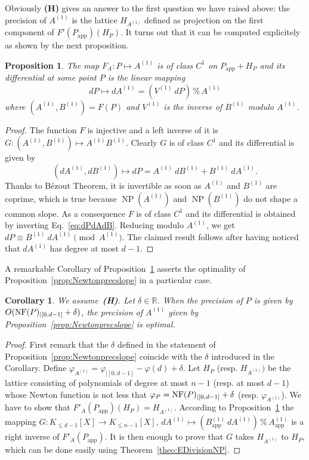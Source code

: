 \documentclass{sig-alternate-05-2015}
\DeclareMathOperator{\NP}{NP}
\newcommand{\R}{\mathbb R}
\newcommand{\NF}{\text{\rm NF}}
\renewcommand{\mod}{\,\%\,}
\newcommand{\app}{\textrm{app}}
\newtheorem{prop}[theo]{Proposition}
\newtheorem{cor}[theo]{Corollary}
\theoremstyle{definition}
\begin{document}
\bigskip

\noindent
Obviously \textbf{(H)} gives an answer to the first question we have 
raised above: the precision of $A^{(1)}$ is the lattice 
$H_{A^{(1)}}$ defined as projection on the first component of 
$F'(P_\app)(H_P)$. It turns out that it can be computed explicitely as 
shown by the next proposition.

\begin{prop}
\label{prop:precA1}
The map $F_A : P \mapsto A^{(1)}$ is of class $C^1$ on $P_\app + H_P$
and its differential at some point $P$ is the linear mapping
$$dP \mapsto dA^{(1)} = (V^{(1)} \: dP) \mod A^{(1)}$$
where $(A^{(1)}, B^{(1)}) = F(P)$ and $V^{(1)}$ is the inverse of 
$B^{(1)}$ modulo $A^{(1)}$.
\end{prop}

\begin{proof}
The function $F$ is injective and a left inverse of it is
$G : (A^{(1)},B^{(1)}) \mapsto A^{(1)}B^{(1)}$.
Clearly $G$ is of class $C^1$ and its differential is given by
\begin{equation}
\label{eq:dPdAdB}
(dA^{(1)}, dB^{(1)}) \mapsto dP = A^{(1)} \: dB^{(1)} + B^{(1)} \: dA^{(1)}.
\end{equation}
Thanks to Bézout Theorem, it is invertible as soon as $A^{(1)}$ and 
$B^{(1)}$ are coprime, which is true because $\NP(A^{(1)})$ and 
$\NP(B^{(1)})$ do not shape a common slope. As a consequence $F$ is of 
class $C^1$ and its differential is obtained by inverting 
Eq.~\eqref{eq:dPdAdB}. Reducing modulo $A^{(1)}$, we get $dP \equiv 
B^{(1)} \: dA^{(1)} \pmod {A^{(1)}}$. The claimed result follows after 
having noticed that $dA^{(1)}$ has degree at most $d{-}1$.
\end{proof}

A remarkable Corollary of Proposition~\ref{prop:precA1} asserts the
optimality of Proposition~\ref{prop:Newtonprecslope} in a particular 
case.

\begin{cor}
We assume~\textbf{(H)}. Let $\delta \in \R$.
When the precision of $P$ is given by $O(\NF(P)_{|[0,d-1]} + \delta)$,
the precision of $A^{(1)}$ given by 
Proposition~\ref{prop:Newtonprecslope} is optimal.
\end{cor}

\begin{proof}
First remark that the $\delta$ defined in the statement of 
Proposition~\ref{prop:Newtonprecslope} coincide with the $\delta$
introduced in the Corollary. Define
$\varphi_{A^{(1)}} = \varphi_{|[0,d{-}1]} - \varphi(d) + \delta$.
Let $H_P$ (resp. $H_{A^{(1)}})$ be the lattice consisting of
polynomials of degree at most $n{-}1$ (resp. at most $d{-}1$)
whose Newton function is not less that $\varphi_P = \NF(P)_{|[0,d-1]} + \delta$ (resp. 
$\varphi_{A^{(1)}}$). We have to show that $F'_A(P_\app)(H_P) = 
H_{A^{(1)}}$. According to Proposition~\ref{prop:precA1}
the mapping $G : K_{\leq d{-}1}[X] \to K_{\leq n{-}1}[X]$,
$dA^{(1)} \mapsto (B_\app^{(1)} \: dA^{(1)}) \mod A_\app^{(1)}$
is a right inverse of $F'_A(P_\app)$. It is then enough to prove
that $G$ takes $H_{A^{(1)}}$ to $H_P$, which can be done easily
using Theorem~\ref{theo:EDivisionNP}.
\end{proof}
\end{document}
